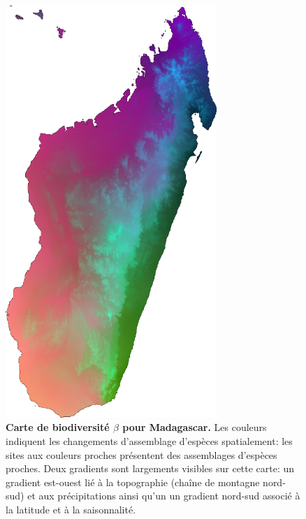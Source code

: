 \documentclass[12pt,]{article}
\begin{document}
\begin{figure}[H]

{\centering \includegraphics[width=8cm]{figures/GDM_map} 

}

\caption{\textbf{Carte de biodiversité \(\beta\) pour Madagascar.}
Les couleurs indiquent les changements d'assemblage d'espèces
spatialement: les sites aux couleurs proches présentent des assemblages
d'espèces proches. Deux gradients sont largements visibles sur cette
carte: un gradient est-ouest lié à la topographie (chaîne de montagne
nord-sud) et aux précipitations ainsi qu'un un gradient nord-sud associé
à la latitude et à la saisonnalité.}\label{fig:GDM}
\end{figure}
\end{document}
